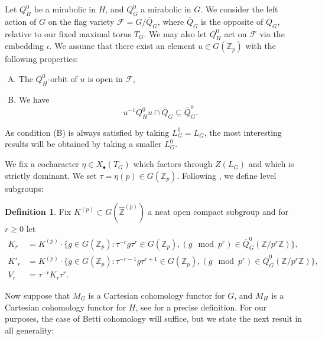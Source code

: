\documentclass[12pt,a4paper,reqno]{amsart}
\theoremstyle{definition}
\newtheorem{definition}{Definition}
\numberwithin{definition}{subsection}
\theoremstyle{definition}
\numberwithin{Definition}{subsection}
\theoremstyle{remark}
\theoremstyle{remark}
\numberwithin{Remark}{subsection}
\theoremstyle{remark}
\theoremstyle{plain}
\numberwithin{Theorem}{subsection}
\theoremstyle{plain}
\theoremstyle{plain}
\theoremstyle{plain}
\theoremstyle{plain}
\theoremstyle{plain}
\theoremstyle{plain}
\theoremstyle{plain}
\newcommand*{\Z}{\mathbb{Z}}
\begin{document}
Let $Q^0_H$ be a mirabolic in $H$, and $Q^0_G$ a mirabolic in $G$. We consider the left action of $G$ on the flag variety $\mathcal{F}=G/\overline{Q}_G$, where $\overline{Q}_G$ is the opposite of $Q_G$, relative to our fixed maximal torus $T_G$. We may also let $Q^0_H$ act on $\mathcal{F}$ via the embedding $\iota$. We assume that there exist an element $u\in G(\Z_p)$ with the following properties:
\begin{enumerate}[(A)]
\item The $Q^0_H$-orbit of $u$ is open in $\mathcal{F}$,
\item We have
\[
u^{-1}Q^0_Hu\cap \overline{Q}_G\subseteq \overline{Q}^0_G.
\]
\end{enumerate}

As condition (B) is always satisfied by taking $L^0_G=L_G$, the most interesting results will be obtained by taking a smaller $L^0_G$.

We fix a cocharacter $\eta\in X_\bullet(T_G)$ which factors through $Z(L_G)$ and which is strictly dominant. We set $\tau=\eta(p)\in G(\Z_p)$. Following \cite{loeffler}, we define level subgroups:
\begin{definition} Fix $K^{(p)}\subset G(\hat{\Z}^{(p)})$ a neat open compact subgroup and for $r\geq 0$ let
\begin{align*}
K_r &=K^{(p)}\cdot\{g\in G(\Z_p):\tau^{-r}g\tau^r\in G(\Z_p), (g\!\!\mod p^r)\in \overline{Q}^0_G(\Z/p^r\Z)\},\\
K'_r &=K^{(p)}\cdot\{g\in G(\Z_p):\tau^{-r-1}g\tau^{r+1}\in G(\Z_p), (g\!\!\mod p^r)\in \overline{Q}^0_G(\Z/p^r\Z)\},\\
V_r&=\tau^{-r}K_r\tau^r.
\end{align*}
\end{definition}

Now suppose that $M_G$ is a Cartesian cohomology functor for $G$, and $M_H$ is a Cartesian cohomology functor for $H$, see \cite[\S3]{loeffler} for a precise definition. For our purposes, the case of Betti cohomology will suffice, but we state the next result in all generality:
\end{document}
